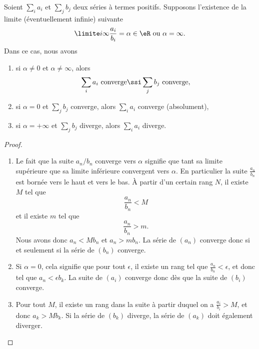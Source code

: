 \begin{proposition}
 Soient $\sum_i a_i$ et $\sum_j b_j$ deux séries à termes positifs. Supposons l'existence de la limite (éventuellement infinie) suivante
\begin{equation}
  \limite i \infty \frac{a_i}{b_i} = \alpha \in \eR \text{ ou $\alpha =
    \infty$.}
\end{equation}
Dans ce cas, nous avons
\begin{enumerate}
\item si $\alpha \neq 0$ et $\alpha\neq \infty$, alors
  \begin{equation}
    \sum_i a_i \text{~converge} \ssi \sum_j b_j\text{~converge,}
  \end{equation}
\item si $\alpha = 0$ et $\sum_j b_j$ converge, alors $\sum_i a_i$
  converge (absolument),
\item si $\alpha = +\infty$ et $\sum_j b_j$ diverge, alors $\sum_i
  a_i$ diverge.
\end{enumerate}
\end{proposition}

\begin{proof}
\begin{enumerate}
    \item
        Le fait que la suite $a_n/b_n$ converge vers $\alpha$ signifie que tant sa limite supérieure que sa limite inférieure convergent vers $\alpha$. En particulier la suite $\frac{ a_n }{ b_n }$ est bornée vers le haut et vers le bas. À partir d'un certain rang $N$, il existe $M$ tel que 
        \begin{equation}
            \frac{ a_n }{ b_n }<M
        \end{equation}
        et il existe $m$ tel que
        \begin{equation}
            \frac{ a_n }{ b_n }>m.
        \end{equation}
        Nous avons donc $a_n<Mb_n$ et $a_n>mb_n$. La série de $(a_n)$ converge donc si et seulement si la série de $(b_n)$ converge.
    \item
        Si $\alpha=0$, cela signifie que pour tout $\epsilon$, il existe un rang tel que $\frac{ a_n }{ b_n }<\epsilon$, et donc tel que $a_n<\epsilon b_k$. La suite de $(a_i)$ converge donc dès que la suite de $(b_i)$ converge.
    \item
        Pour tout $M$, il existe un rang dans la suite à partir duquel on a $\frac{ a_i }{ b_i }>M$, et donc $a_k>Mb_k$. Si la série de $(b_k)$ diverge, la série de $(a_k)$ doit également diverger.
\end{enumerate}
\end{proof}


